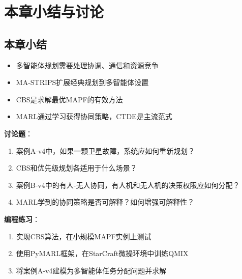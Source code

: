 \section{本章小结与讨论}

\subsection*{本章小结}

\begin{itemize}[leftmargin=2em]
  \item 多智能体规划需要处理协调、通信和资源竞争
  \item MA-STRIPS扩展经典规划到多智能体设置
  \item CBS是求解最优MAPF的有效方法
  \item MARL通过学习获得协同策略，CTDE是主流范式
\end{itemize}

\begin{discussbox}
\textbf{讨论题}：
\begin{enumerate}
  \item 案例A-v4中，如果一颗卫星故障，系统应如何重新规划？
  \item CBS和优先级规划各适用于什么场景？
  \item 案例B-v4中的有人-无人协同，有人机和无人机的决策权限应如何分配？
  \item MARL学到的协同策略是否可解释？如何增强可解释性？
\end{enumerate}

\textbf{编程练习}：
\begin{enumerate}
  \item 实现CBS算法，在小规模MAPF实例上测试
  \item 使用PyMARL框架，在StarCraft微操环境中训练QMIX
  \item 将案例A-v4建模为多智能体任务分配问题并求解
\end{enumerate}
\end{discussbox}
